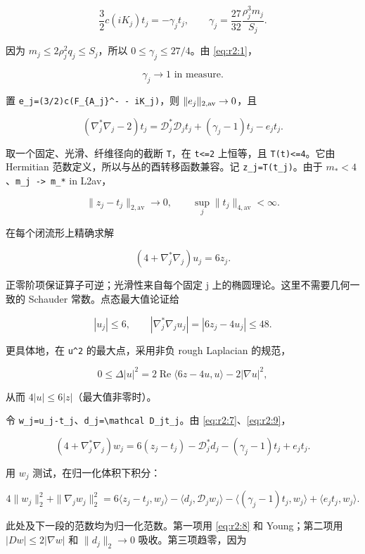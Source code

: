 \documentclass[UTF8,11pt,openany,oneside,fontset=none]{ctexbook}
\begin{document}
\[
 \frac32c(iK_j)t_j=-\gamma_jt_j,
 \qquad\gamma_j=\frac{27}{32}\frac{\rho_j^3m_j}{S_j}.
 \tag{2.6}\label{eq:r2:6}
\]

因为 \(m_j\le2\rho_j^2q_j\le S_j\)，所以 \(0\le\gamma_j\le27/4\)。由 \eqref{eq:r2:1}，

\[
 \gamma_j\longrightarrow1\text{ in measure}.
\]

置 \texttt{e\_j=(3/2)c(F\_\{A\_j\}\^{}-\ -\ iK\_j)}，则 \(\|e_j\|_{2,\rm av}\to0\)，且

\[
 (\nabla_j^*\nabla_j-2)t_j
 =\mathcal D_j^*\mathcal D_jt_j+(\gamma_j-1)t_j-e_jt_j.
 \tag{2.7}\label{eq:r2:7}
\]

取一个固定、光滑、纤维径向的截断 \texttt{T}，在 \texttt{\textbar{}t\textbar{}\textless{}=2} 上恒等，且 \texttt{\textbar{}T(t)\textbar{}\textless{}=4}。它由 Hermitian 范数定义，所以与丛的酉转移函数兼容。记 \texttt{z\_j=T(t\_j)}。由于 \(m_*<4\)、\texttt{m\_j\ -\textgreater{}\ m\_*} in L2av，

\[
 \|z_j-t_j\|_{2,\mathrm{av}}\longrightarrow0,
 \qquad \sup_j\|t_j\|_{4,\mathrm{av}}<\infty.
 \tag{2.8}\label{eq:r2:8}
\]

在每个闭流形上精确求解

\[
 \boxed{(4+\nabla_j^*\nabla_j)u_j=6z_j.}
 \tag{2.9}\label{eq:r2:9}
\]

正零阶项保证算子可逆；光滑性来自每个固定 j 上的椭圆理论。这里不需要几何一致的 Schauder 常数。点态最大值论证给

\[
 |u_j|\le6,\qquad
 |\nabla_j^*\nabla_j u_j|=|6z_j-4u_j|\le48.
\]

更具体地，在 \texttt{\textbar{}u\textbar{}\^{}2} 的最大点，采用非负 rough Laplacian 的规范，

\[
 0\le\Delta|u|^2
 =2\operatorname{Re}\langle6z-4u,u\rangle-2|\nabla u|^2,
\]

从而 \(4|u|\le6|z|\)（最大值非零时）。

令 \texttt{w\_j=u\_j-t\_j}、\texttt{d\_j=\textbackslash{}mathcal\ D\_jt\_j}。由 \eqref{eq:r2:7}、\eqref{eq:r2:9}，

\[
 (4+\nabla_j^*\nabla_j)w_j
 =6(z_j-t_j)-\mathcal D_j^*d_j-(\gamma_j-1)t_j+e_jt_j.
 \tag{2.10}\label{eq:r2:10}
\]

用 \(w_j\) 测试，在归一化体积下积分：

\[
 4\|w_j\|_2^2+\|\nabla_jw_j\|_2^2
 =6\langle z_j-t_j,w_j\rangle
 -\langle d_j,\mathcal D_jw_j\rangle
 -\langle(\gamma_j-1)t_j,w_j\rangle
 +\langle e_jt_j,w_j\rangle.
\]

此处及下一段的范数均为归一化范数。第一项用 \eqref{eq:r2:8} 和 Young；第二项用 \(|Dw|\le2|\nabla w|\) 和 \(\|d_j\|_2\to0\) 吸收。第三项趋零，因为
\end{document}
